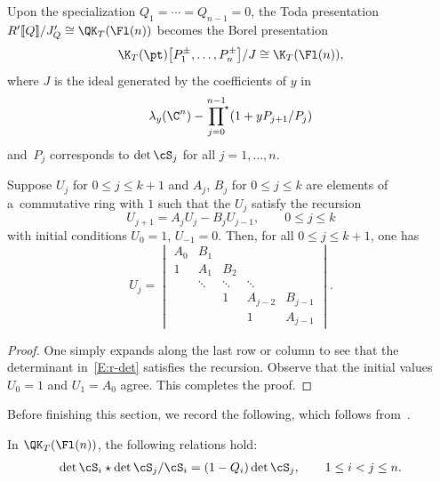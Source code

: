  \begin{Remark}
 Upon the specialization $Q_1=\dotsm=Q_{n-1}=0$, the Toda presentation $R'[\![Q]\!]/J'_Q\cong\QK_T(\Fl(n))$ becomes the Borel presentation
 \[
 \K_T(\pt)\bigl[P_1^\pm,\dots,P_n^{\pm}\bigr]/J\cong \K_T(\Fl(n)),
 \]
 where $J$ is the ideal generated by the coefficients of $y$ in
 \[
 \lambda_y(\C^n)-\sideset{}{^\star}\prod_{j=0}^{n-1} (1+yP_{j+1}/P_j)
 \]
 and~$P_j$ corresponds to $\det \cS_j$ for all $j=1,\dots,n$.
 \end{Remark}
 \begin{Lemma}
 \label{L:r-det}
 Suppose $U_j$ for $0\le j\le k+1$ and $A_j$, $B_j$ for $0\le j\le k$ are elements of a~commutative ring with $1$ such that the $U_j$ satisfy the recursion
 \begin{equation*}
 U_{j+1}=A_jU_{j}-B_jU_{j-1},\qquad 0\le j\le k
 \end{equation*}
 with initial conditions $U_0=1$, $U_{-1}=0$. Then, for all $0\le j\le k+1$, one has
 \begin{equation}
 \label{E:r-det}
 U_j=
 \begin{vmatrix}
 A_0 & B_1 & & & \\
 1 & A_1 & B_2 & & \\
 & \ddots & \ddots & \ddots & \\
 & & 1 & A_{j-2} & B_{j-1}\\
 & & & 1 & A_{j-1}
 \end{vmatrix}.
 \end{equation}
 \end{Lemma}

 \begin{proof}
 One simply expands along the last row or column to see that the determinant in~\eqref{E:r-det} satisfies the recursion. Observe that the initial values $U_0=1$ and $U_1=A_0$ agree. This completes the proof.
 \end{proof}

 Before finishing this section, we record the following, which follows from~\cite[Proposition~5.2]{maeno.naito.sagaki:QKideal}.

 \begin{Proposition}\label{prop:MNS}
 In $\QK_T(\Fl(n))$, the following relations hold:
 \begin{gather*}
 \det \cS_i \star \det \cS_j/\cS_i = (1-Q_i) \det \cS_j, \qquad 1 \le i < j \le n.
 \end{gather*}
 \end{Proposition}


